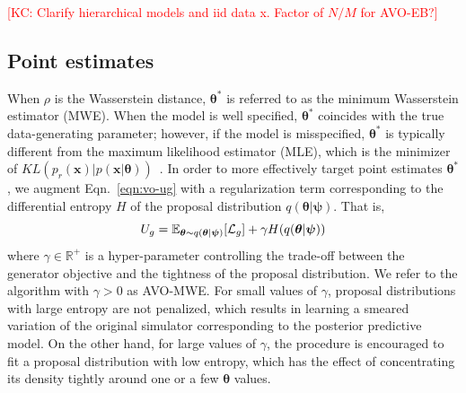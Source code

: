 \documentclass[twocolumn,superscriptaddress,aps]{revtex4-1}
\newcommand{\kcnote}[1]{\textcolor{red}{[KC: #1]}}
\newcommand{\qxpsi}{q(\mathbf{x}|\bfpsi)}
\newcommand{\bftheta}{{\bm \theta}}
\newcommand{\bfpsi}{{\bm \psi}}
\newcommand{\bfx}{\mathbf{x}}
\theoremstyle{plain}
\begin{document}



\kcnote{Clarify hierarchical models and iid data x. Factor of $N/M$ for AVO-EB?}


\subsection{Point estimates}


When $\rho$ is the Wasserstein distance, $\bftheta^*$ is referred to as the
minimum Wasserstein estimator (MWE). When the model is well specified, $\bftheta^*$
coincides with the true data-generating parameter; however, if the model is
misspecified, $\bftheta^*$ is typically different from the maximum likelihood
estimator (MLE), which is the minimizer of $KL(p_r(\bfx) | p(\bfx |
\bftheta))$~\citep{bernton2017inference}. In order to more effectively target
point estimates $\bftheta^*$, we augment Eqn.~\ref{eqn:vo-ug} with a
regularization term corresponding to the differential entropy $H$ of the
proposal distribution $q(\bftheta | \bfpsi)$. That is,
\begin{equation}
    U_g = \mathbb{E}_{\bftheta \sim q(\bftheta|\bfpsi)} [ {\cal L}_g ] + \gamma H(q(\bftheta|\bfpsi))
\end{equation}
where $\gamma \in \mathbb{R}^+$ is a hyper-parameter controlling the trade-off
between the generator objective and the tightness of the proposal distribution.
We refer to the algorithm with $\gamma>0$ as AVO-MWE.
For small values of $\gamma$,
proposal distributions with large entropy are not penalized, which results
in learning a smeared variation of the original simulator corresponding to the posterior predictive model. On the other hand,
for large values of $\gamma$, the procedure is encouraged to fit a proposal
distribution with low entropy, which has the effect of concentrating its density
tightly around one or a few $\bftheta$ values.
\end{document}
